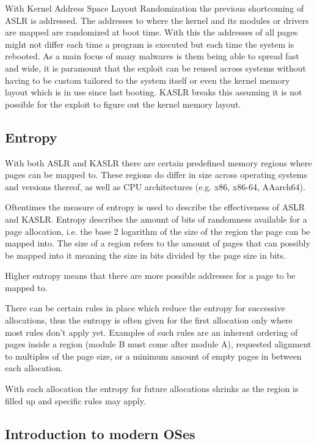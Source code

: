 With Kernel Address Space Layout Randomization the previous shortcoming of ASLR is addressed.
The addresses to where the kernel and its modules or drivers are mapped are randomized at boot time.
With this the addresses of all pages might not differ each time a program is executed but each time the system is rebooted.
As a main focus of many malwares is them being able to spread fast and wide, it is paramount that the exploit can be reused across systems without having to be custom tailored to the system itself or even the kernel memory layout which is in use since last booting.
KASLR breaks this assuming it is not possible for the exploit to figure out the kernel memory layout.

\subsection{Entropy}

With both ASLR and KASLR there are certain predefined memory regions where pages can be mapped to.
These regions do differ in size across operating systems and versions thereof, as well as CPU architectures (e.g. x86, x86-64, AAarch64).

Oftentimes the measure of entropy is used to describe the effectiveness of ASLR and KASLR.
Entropy describes the amount of bits of randomness available for a page allocation, i.e. the base 2 logarithm of the size of the region the page can be mapped into.
The size of a region refers to the amount of pages that can possibly be mapped into it meaning the size in bits divided by the page size in bits.

Higher entropy means that there are more possible addresses for a page to be mapped to.

There can be certain rules in place which reduce the entropy for successive allocations,  thus the entropy is often given for the first allocation only where most rules don't apply yet.
Examples of such rules are an inherent ordering of pages inside a region (module B must come after module A), requested alignment to multiples of the page size, or a minimum amount of empty pages in between each allocation.

With each allocation the entropy for future allocations shrinks as the region is filled up and specific rules may apply.

\subsection{Introduction to modern OSes}

